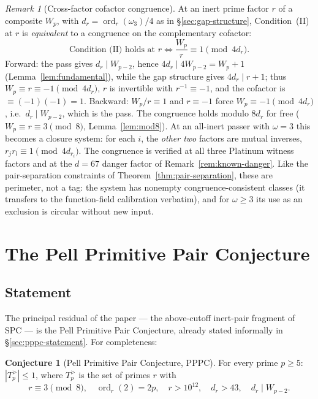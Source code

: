 \documentclass[11pt]{amsart}
\theoremstyle{plain}
\theoremstyle{definition}
\newtheorem{conjecture}[theorem]{Conjecture}
\theoremstyle{remark}
\newtheorem{remark}[theorem]{Remark}
\numberwithin{equation}{section}
\newcommand{\ord}{\operatorname{ord}}
\begin{document}
\begin{remark}[Cross-factor cofactor congruence]\label{rem:cofactor-congruence}
At an inert prime factor $r$ of a composite $W_p$, with $d_r = \ord_r(\omega_3)/4$ as in \S\ref{sec:gap-structure}, Condition~(II) at $r$ is \emph{equivalent} to a congruence on the complementary cofactor:
\[
  \text{Condition~(II) holds at } r
  \iff
  \frac{W_p}{r} \equiv 1 \pmod{4 d_r}.
\]
Forward: the pass gives $d_r \mid W_{p-2}$, hence $4 d_r \mid 4 W_{p-2} = W_p + 1$ (Lemma~\ref{lem:fundamental}), while the gap structure gives $4 d_r \mid r + 1$; thus $W_p \equiv r \equiv -1 \pmod{4 d_r}$, $r$ is invertible with $r^{-1} \equiv -1$, and the cofactor is $\equiv (-1)(-1) = 1$. Backward: $W_p/r \equiv 1$ and $r \equiv -1$ force $W_p \equiv -1 \pmod{4 d_r}$, i.e.\ $d_r \mid W_{p-2}$, which is the pass. The congruence holds modulo $8 d_r$ for free ($W_p \equiv r \equiv 3 \pmod 8$, Lemma~\ref{lem:mod8}). At an all-inert passer with $\omega = 3$ this becomes a closure system: for each $i$, the \emph{other two} factors are mutual inverses, $r_j r_l \equiv 1 \pmod{4 d_{r_i}}$. The congruence is verified at all three Platinum witness factors and at the $d = 67$ danger factor of Remark~\ref{rem:known-danger}. Like the pair-separation constraints of Theorem~\ref{thm:pair-separation}, these are perimeter, not a tag: the system has nonempty congruence-consistent classes (it transfers to the function-field calibration verbatim), and for $\omega \geq 3$ its use as an exclusion is circular without new input.
\end{remark}

\section{The Pell Primitive Pair Conjecture}\label{sec:pppc}

\subsection{Statement}

The principal residual of the paper --- the above-cutoff inert-pair fragment of SPC --- is the Pell Primitive Pair Conjecture, already stated informally in \S\ref{sec:pppc-statement}. For completeness:

\begin{conjecture}[Pell Primitive Pair Conjecture, PPPC]\label{conj:pppc}
For every prime $p \geq 5$: $|T_p^{>}| \leq 1$, where $T_p^{>}$ is the set of primes $r$ with
\[
  r \equiv 3 \pmod 8,\quad \ord_r(2) = 2 p,\quad r > 10^{12},\quad d_r > 43,\quad d_r \mid W_{p-2}.
\]
\end{conjecture}
\end{document}

